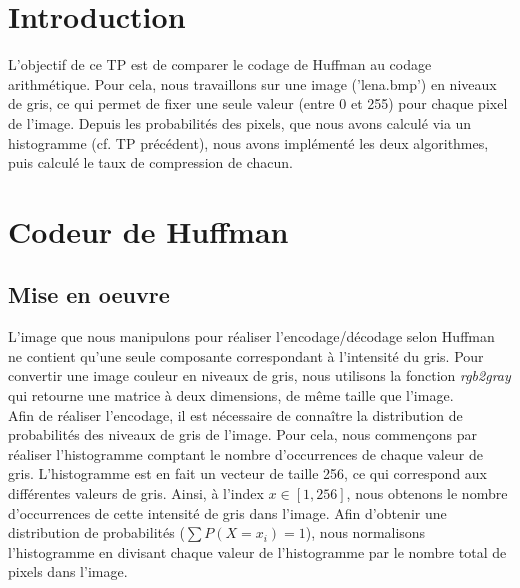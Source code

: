 \documentclass[a4paper, 12pt]{article}
\begin{document}






\clearpage

\section{Introduction}
L'objectif de ce TP est de comparer le codage de Huffman au codage arithmétique. Pour cela, nous travaillons sur une image ('lena.bmp') en niveaux de gris, ce qui permet de fixer une seule valeur (entre 0 et 255) pour chaque pixel de l'image. Depuis les probabilités des pixels, que nous avons calculé via un histogramme (cf. TP précédent), nous avons implémenté les deux algorithmes, puis calculé le taux de compression de chacun.

\section{Codeur de Huffman}

\subsection{Mise en oeuvre}

L'image que nous manipulons pour réaliser l'encodage/décodage selon Huffman ne contient qu'une seule composante correspondant à l'intensité du gris. Pour convertir une image couleur en niveaux de gris, nous utilisons la fonction \textit{rgb2gray} qui retourne une matrice à deux dimensions, de même taille que l'image.\\

Afin de réaliser l'encodage, il est nécessaire de connaître la distribution de probabilités des niveaux de gris de l'image. Pour cela, nous commençons par réaliser l'histogramme comptant le nombre d'occurrences de chaque valeur de gris. L'histogramme est en fait un vecteur de taille 256, ce qui correspond aux différentes valeurs de gris. Ainsi, à l'index $x\in[1, 256]$, nous obtenons le nombre d’occurrences de cette intensité de gris dans l'image. Afin d'obtenir une distribution de probabilités ($\sum P(X=x_{i}) = 1$), nous normalisons l'histogramme en divisant chaque valeur de l'histogramme par le nombre total de pixels dans l'image. \\
\end{document}
